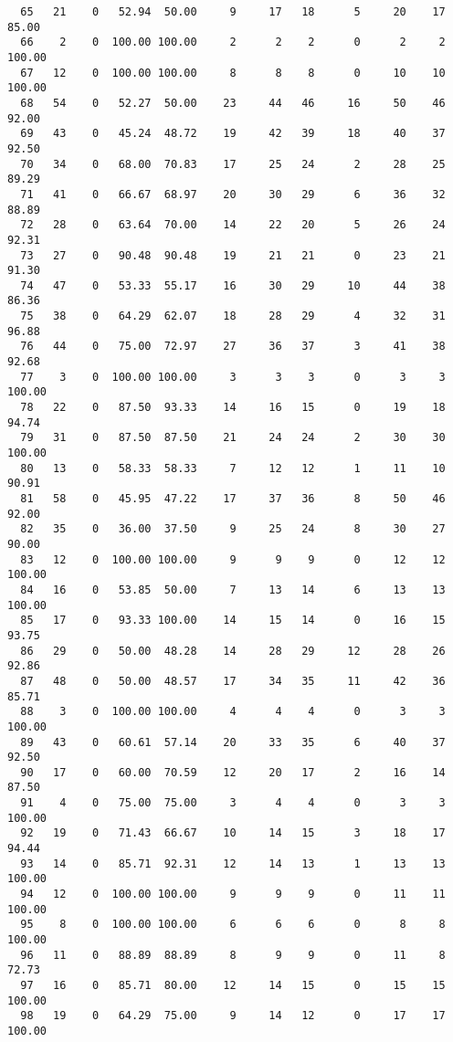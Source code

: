 \begin{verbatim}
  65   21    0   52.94  50.00     9     17   18      5     20    17    85.00
  66    2    0  100.00 100.00     2      2    2      0      2     2   100.00
  67   12    0  100.00 100.00     8      8    8      0     10    10   100.00
  68   54    0   52.27  50.00    23     44   46     16     50    46    92.00
  69   43    0   45.24  48.72    19     42   39     18     40    37    92.50
  70   34    0   68.00  70.83    17     25   24      2     28    25    89.29
  71   41    0   66.67  68.97    20     30   29      6     36    32    88.89
  72   28    0   63.64  70.00    14     22   20      5     26    24    92.31
  73   27    0   90.48  90.48    19     21   21      0     23    21    91.30
  74   47    0   53.33  55.17    16     30   29     10     44    38    86.36
  75   38    0   64.29  62.07    18     28   29      4     32    31    96.88
  76   44    0   75.00  72.97    27     36   37      3     41    38    92.68
  77    3    0  100.00 100.00     3      3    3      0      3     3   100.00
  78   22    0   87.50  93.33    14     16   15      0     19    18    94.74
  79   31    0   87.50  87.50    21     24   24      2     30    30   100.00
  80   13    0   58.33  58.33     7     12   12      1     11    10    90.91
  81   58    0   45.95  47.22    17     37   36      8     50    46    92.00
  82   35    0   36.00  37.50     9     25   24      8     30    27    90.00
  83   12    0  100.00 100.00     9      9    9      0     12    12   100.00
  84   16    0   53.85  50.00     7     13   14      6     13    13   100.00
  85   17    0   93.33 100.00    14     15   14      0     16    15    93.75
  86   29    0   50.00  48.28    14     28   29     12     28    26    92.86
  87   48    0   50.00  48.57    17     34   35     11     42    36    85.71
  88    3    0  100.00 100.00     4      4    4      0      3     3   100.00
  89   43    0   60.61  57.14    20     33   35      6     40    37    92.50
  90   17    0   60.00  70.59    12     20   17      2     16    14    87.50
  91    4    0   75.00  75.00     3      4    4      0      3     3   100.00
  92   19    0   71.43  66.67    10     14   15      3     18    17    94.44
  93   14    0   85.71  92.31    12     14   13      1     13    13   100.00
  94   12    0  100.00 100.00     9      9    9      0     11    11   100.00
  95    8    0  100.00 100.00     6      6    6      0      8     8   100.00
  96   11    0   88.89  88.89     8      9    9      0     11     8    72.73
  97   16    0   85.71  80.00    12     14   15      0     15    15   100.00
  98   19    0   64.29  75.00     9     14   12      0     17    17   100.00

\end{verbatim}
